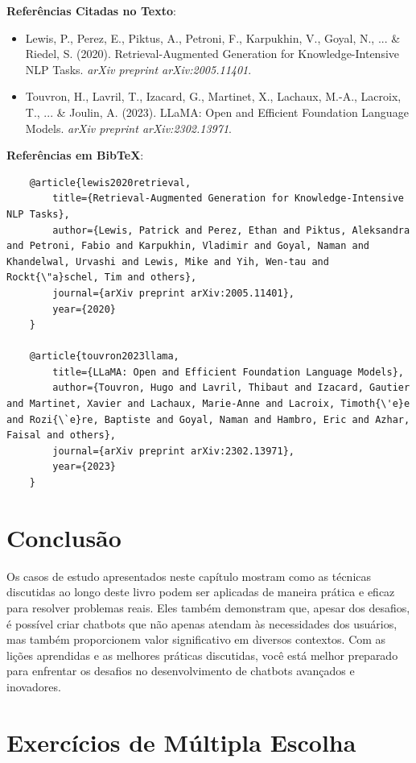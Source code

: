 \documentclass[14pt,a4paper,oneside]{book}
\begin{document}
\textbf{Referências Citadas no Texto}:

\begin{itemize}
	\item Lewis, P., Perez, E., Piktus, A., Petroni, F., Karpukhin, V., Goyal, N., ... \& Riedel, S. (2020). Retrieval-Augmented Generation for Knowledge-Intensive NLP Tasks. \textit{arXiv preprint arXiv:2005.11401}.
	\item Touvron, H., Lavril, T., Izacard, G., Martinet, X., Lachaux, M.-A., Lacroix, T., ... \& Joulin, A. (2023). LLaMA: Open and Efficient Foundation Language Models. \textit{arXiv preprint arXiv:2302.13971}.
\end{itemize}

\textbf{Referências em BibTeX}:

\begin{verbatim}
	@article{lewis2020retrieval,
		title={Retrieval-Augmented Generation for Knowledge-Intensive NLP Tasks},
		author={Lewis, Patrick and Perez, Ethan and Piktus, Aleksandra and Petroni, Fabio and Karpukhin, Vladimir and Goyal, Naman and Khandelwal, Urvashi and Lewis, Mike and Yih, Wen-tau and Rockt{\"a}schel, Tim and others},
		journal={arXiv preprint arXiv:2005.11401},
		year={2020}
	}
	
	@article{touvron2023llama,
		title={LLaMA: Open and Efficient Foundation Language Models},
		author={Touvron, Hugo and Lavril, Thibaut and Izacard, Gautier and Martinet, Xavier and Lachaux, Marie-Anne and Lacroix, Timoth{\'e}e and Rozi{\`e}re, Baptiste and Goyal, Naman and Hambro, Eric and Azhar, Faisal and others},
		journal={arXiv preprint arXiv:2302.13971},
		year={2023}
	}
\end{verbatim}

\section{Conclusão}

Os casos de estudo apresentados neste capítulo mostram como as técnicas discutidas ao longo deste livro podem ser aplicadas de maneira prática e eficaz para resolver problemas reais. Eles também demonstram que, apesar dos desafios, é possível criar chatbots que não apenas atendam às necessidades dos usuários, mas também proporcionem valor significativo em diversos contextos. Com as lições aprendidas e as melhores práticas discutidas, você está melhor preparado para enfrentar os desafios no desenvolvimento de chatbots avançados e inovadores.

\section*{Exercícios de Múltipla Escolha}
\end{document}
